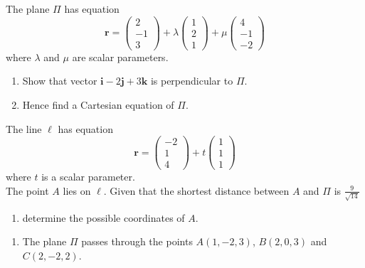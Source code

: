 \documentclass[leqno]{article}
\begin{document}
\begin{enumerate}[
  label=\textbf{\arabic*.},
  leftmargin=*,
  topsep=0pt,
  partopsep=0pt,
  parsep=0pt
]
The plane $\Pi$ has equation
\[
\mathbf{r}=\begin{pmatrix}2\\-1\\3\end{pmatrix}+\lambda\begin{pmatrix}1\\2\\1\end{pmatrix}+\mu\begin{pmatrix}4\\-1\\-2\end{pmatrix}
\]
where $\lambda$ and $\mu$ are scalar parameters. \\
\begin{enumerate}[label=\textbf{(\alph*)}]
  \item Show that vector $\mathbf{i}-2\mathbf{j}+3\mathbf{k}$ is perpendicular to $\Pi$.  \\
  \item Hence find a Cartesian equation of $\Pi$.  \\
\end{enumerate}
The line $\ell$ has equation
\[
\mathbf{r}=\begin{pmatrix}-2\\1\\4\end{pmatrix}+t\begin{pmatrix}1\\1\\1\end{pmatrix}
\]
where $t$ is a scalar parameter. \\

The point $A$ lies on $\ell$. Given that the shortest distance between $A$ and $\Pi$ is $\tfrac{9}{\sqrt{14}}$ \\
\begin{enumerate}[label=\textbf{(\alph*)}, resume]
  \item determine the possible coordinates of $A$.  \\
\end{enumerate}

\newpage

\questionitem

\begin{enumerate}[label=\textbf{(\alph*)}]
  \item The plane $\Pi$ passes through the points $A(1,-2,3)$, $B(2,0,3)$ and $C(2,-2,2)$.\\
  

\end{enumerate}
\end{enumerate}
\end{document}
